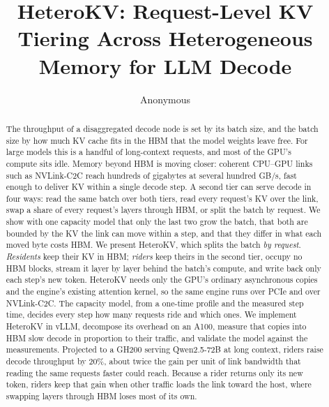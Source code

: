 \documentclass[10pt,twocolumn,letterpaper]{article}
\title{\textbf{HeteroKV: Request-Level KV Tiering Across Heterogeneous Memory for LLM Decode}}
\author{Anonymous}
\date{}
\newif\ifdraft\drafttrue
\newcommand{\torun}[1]{\textcolor{red}{[\textbf{To run:} #1]}}
\newcommand{\torun}[1]{\GenericError{}{UNRESOLVED MEASUREMENT}{}{}}
\newcommand{\sysname}{HeteroKV}
\begin{document}
\maketitle
\begin{abstract}
The throughput of a disaggregated decode node is set by its batch size, and the
batch size by how much KV cache fits in the HBM that the model weights leave
free. For large models this is a handful of long-context requests, and most of
the GPU's compute sits idle. Memory beyond HBM is moving closer: coherent
CPU--GPU links such as NVLink-C2C reach hundreds of gigabytes at several
hundred GB/s, fast enough to deliver KV within a single decode step. A second
tier can serve decode in four ways: read the same batch over both tiers, read
every request's KV over the link, swap a share of every request's layers
through HBM, or split the batch by request. We show with one capacity model
that only the last two grow the batch, that both are bounded by the KV the
link can move within a step, and that they differ in what each moved byte
costs HBM. We present \sysname{}, which splits the batch \emph{by request}.
\emph{Residents} keep their KV in HBM; \emph{riders} keep theirs in the second
tier, occupy no HBM blocks, stream it layer by layer behind the batch's
compute, and write back only each step's new token. \sysname{} needs only the GPU's ordinary
asynchronous copies and the engine's existing attention kernel, so the same
engine runs over PCIe and over NVLink-C2C. The capacity model, from a one-time
profile and the measured step time, decides every step how many requests ride
and which ones. We implement \sysname{} in vLLM, decompose its overhead on an
A100, measure that copies into HBM slow decode in proportion to their traffic,
and validate the model against the measurements. Projected to a GH200 serving
Qwen2.5-72B at long context, riders raise decode throughput by 20\%, about
twice the gain per unit of link bandwidth that reading the same requests
faster could reach. Because a rider returns only its new token, riders keep
that gain when other traffic loads the link toward the host, where swapping
layers through HBM loses most of its own.
\end{abstract}
\ifdraft\linenumbers\fi
\end{document}
